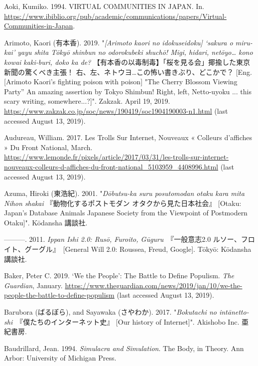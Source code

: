 \documentclass[10pt,british,A4paper,twoside]{memoir}
\begin{document}
\hypertarget{ref-aoki_virtual_1994}{}
Aoki, Kumiko. 1994. VIRTUAL COMMUNITIES IN JAPAN. In.
\url{https://www.ibiblio.org/pub/academic/communications/papers/Virtual-Communities-in-Japan}.

\hypertarget{ref-arimoto_eng._2019}{}
Arimoto, Kaori (有本香). 2019. "\emph{[Arimoto kaori no idokuseidoku] `sakura o miru-kai' yayu shita Tōkyō shinbun no odorokubeki shuchō! Migi, hidari, netōyo… kono kowai kaki-buri, doko ka de?} 【有本香の以毒制毒】「桜を見る会」揶揄した東京新聞の驚くべき主張！ 右、左、ネトウヨ…この怖い書きぶり、どこかで？ [Eng. [Arimoto Kaori's fighting poison with poison] "The Cherry Blossom Viewing Party” An amazing assertion by Tokyo Shimbun! Right, left, Netto-uyoku ... this scary writing, somewhere...?]". Zakzak. April 19, 2019.
\url{https://www.zakzak.co.jp/soc/news/190419/soc1904190003-n1.html} (last accessed August 13, 2019).

\hypertarget{ref-audureau_les_2017}{}
Audureau, William. 2017. Les Trolls Sur Internet, Nouveaux « Colleurs
d'affiches » Du Front National, March.
\url{https://www.lemonde.fr/pixels/article/2017/03/31/les-trolls-sur-internet-nouveaux-colleurs-d-affiches-du-front-national_5103959_4408996.html} (last accessed August 13, 2019).

\hypertarget{ref-azuma_otaku:_2001}{}
Azuma, Hiroki (東浩紀). 2001. "\emph{Dōbutsu-ka suru posutomodan otaku kara mita Nihon shakai} 『動物化するポストモダン オタクから見た日本社会』 [Otaku: Japan's Database Animals Japanese Society from the Viewpoint of Postmodern Otaku]". Kōdansha 講談社.

\hypertarget{ref-azuma_ippan_2011}{}
---------. 2011. \emph{Ippan Ishi 2.0: Rusō, Furoito, Gūguru}　『一般意志2.0 ルソー、フロイト、グーグル』　[General Will 2.0: Roussea, Freud, Google]. Tōkyō:
Kōdansha 講談社.

\hypertarget{ref-baker_we_2019}{}
Baker, Peter C. 2019. `We the People': The Battle to Define Populism.
\emph{The Guardian}, January.
\url{https://www.theguardian.com/news/2019/jan/10/we-the-people-the-battle-to-define-populism} (last accessed August 13, 2019).

\hypertarget{ref-barubora_eng:_2017}{}
Barubora (ばるぼら), and Sayawaka (さやわか). 2017. "\emph{Bokutachi no intānetto-shi}　『僕たちのインターネット史』 [Our history of Internet]".
Akishobo Inc. 亜紀書房.

\hypertarget{ref-baudrillard_simulacra_1994}{}
Baudrillard, Jean. 1994. \emph{Simulacra and Simulation}. The Body, in
Theory. Ann Arbor: University of Michigan Press.
\end{document}
